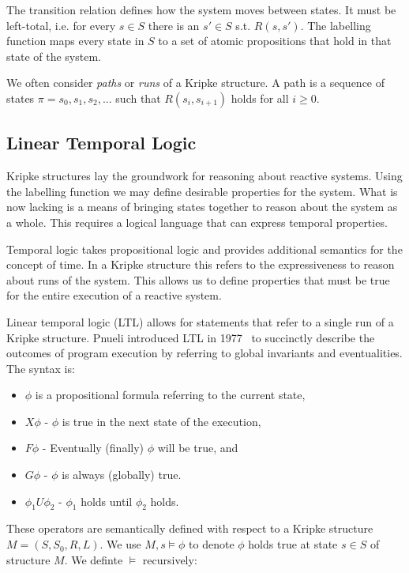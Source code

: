 The transition relation defines how the system moves between states. It must be
left-total, i.e. for every $s \in S$ there is an $s' \in S$ s.t. $R(s, s')$.
The labelling function maps every state in $S$ to a set of atomic propositions
that hold in that state of the system.

We often consider \emph{paths} or \emph{runs} of a Kripke structure. A path is
a sequence of states $\pi = s_0, s_1, s_2, ...$ such that $R(s_i, s_{i+1})$
holds for all $i \geq 0$.

\subsection{Linear Temporal Logic}

Kripke structures lay the groundwork for reasoning about reactive systems.
Using the labelling function we may define desirable properties for the system.
What is now lacking is a means of bringing states together to reason about the
system as a whole. This requires a logical language that can express temporal
properties.

Temporal logic takes propositional logic and provides additional semantics for
the concept of time. In a Kripke structure this refers to the expressiveness to
reason about runs of the system. This allows us to define properties that must
be true for the entire execution of a reactive system.

Linear temporal logic (LTL) allows for statements that refer to a single run of
a Kripke structure. Pnueli introduced LTL in 1977~\cite{Pnueli77} to succinctly
describe the outcomes of program execution by referring to global invariants
and eventualities. The syntax is:

\begin{itemize}
    \item $\phi$ is a propositional formula referring to the current state,
    \item $X\phi$ - $\phi$ is true in the next state of the execution,
    \item $F\phi$ - Eventually (finally) $\phi$ will be true, and
    \item $G\phi$ - $\phi$ is always (globally) true.
    \item $\phi_1 U \phi_2$ - $\phi_1$ holds until $\phi_2$ holds.
\end{itemize}

These operators are semantically defined with respect to a Kripke structure $M
= (S, S_0, R, L)$. We use $M, s \models \phi$ to denote $\phi$ holds true at
state $s \in S$ of structure $M$. We definte $\models$ recursively:

